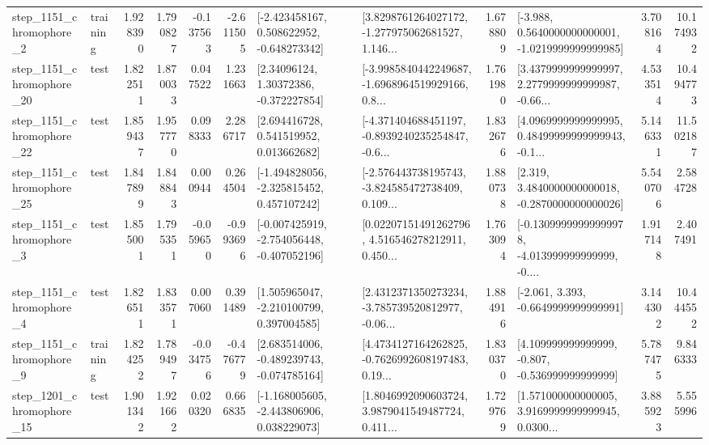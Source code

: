 \begin{tabular}{llrrrrllrlrr}
  step\_1151\_chromophore\_2 &  training &      1.928390 &    1.790827 &     -0.137563 & -2.611505 &   [-2.423458167, 0.508622952, -0.648273342] &  [3.8298761264027172, -1.277975062681527, 1.146... &       1.678809 &  [-3.988, 0.5640000000000001, -1.0219999999999985] &            3.708164 &         10.174932 \\
 step\_1151\_chromophore\_20 &      test &      1.822511 &    1.870033 &      0.047522 &  1.231663 &      [2.34096124, 1.30372386, -0.372227854] &  [-3.9985840442249687, -1.6968964519929166, 0.8... &       1.761980 &  [3.4379999999999997, 2.2779999999999987, -0.66... &            4.533514 &         10.494773 \\
 step\_1151\_chromophore\_22 &      test &      1.859437 &    1.957770 &      0.098333 &  2.286717 &     [2.694416728, 0.541519952, 0.013662682] &  [-4.371404688451197, -0.8939240235254847, -0.6... &       1.832676 &  [4.0969999999999995, 0.48499999999999943, -0.1... &            5.146331 &         11.502187 \\
 step\_1151\_chromophore\_25 &      test &      1.847899 &    1.848843 &      0.000944 &  0.264504 &   [-1.494828056, -2.325815452, 0.457107242] &  [-2.576443738195743, -3.824585472738409, 0.109... &       1.880738 &   [2.319, 3.4840000000000018, -0.2870000000000026] &            5.540706 &          2.584728 \\
  step\_1151\_chromophore\_3 &      test &      1.855001 &    1.795351 &     -0.059650 & -0.993696 &  [-0.007425919, -2.754056448, -0.407052196] &  [0.02207151491262796, 4.516546278212911, 0.450... &       1.763094 &  [-0.13099999999999978, -4.013999999999999, -0.... &            1.917148 &          2.407491 \\
  step\_1151\_chromophore\_4 &      test &      1.826511 &    1.833571 &      0.007060 &  0.391489 &    [1.505965047, -2.210100799, 0.397004585] &  [2.4312371350273234, -3.785739520812977, -0.06... &       1.884916 &               [-2.061, 3.393, -0.6649999999999991] &            3.144302 &         10.444552 \\
  step\_1151\_chromophore\_9 &  training &      1.824252 &    1.789497 &     -0.034756 & -0.476779 &   [2.683514006, -0.489239743, -0.074785164] &  [4.4734127164262825, -0.7626992608197483, 0.19... &       1.830370 &    [4.109999999999999, -0.807, -0.536999999999999] &            5.787475 &          9.846333 \\
 step\_1201\_chromophore\_15 &      test &      1.901342 &    1.921662 &      0.020320 &  0.666835 &   [-1.168005605, -2.443806906, 0.038229073] &  [1.8046992090603724, 3.9879041549487724, 0.411... &       1.729769 &  [1.571000000000005, 3.9169999999999945, 0.0300... &            3.885923 &          5.555996 \\

\end{tabular}
